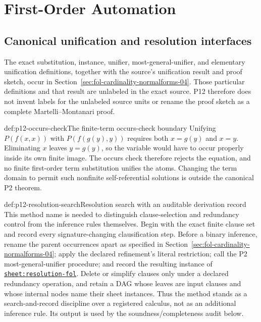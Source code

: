 \chapter{First-Order Automation}
\label{sec:p12-first-order-automation}

\section{Canonical unification and resolution interfaces}

The exact substitution, instance, unifier, most-general-unifier, and elementary
unification definitions, together with the source's unification result and
proof sketch, occur in Section~\ref{sec:fol-cardinality-normalforms-04}.
Those particular definitions and that result are unlabeled in the exact
source.  P12 therefore does not invent labels for the unlabeled source units
or rename the proof sketch as a complete Martelli--Montanari proof.

\begin{hbexample}{def:p12-occurs-check}{The finite-term occurs-check boundary}
Unifying \(P(f(x,x))\) with \(P(f(g(y),y))\) requires both \(x=g(y)\) and
\(x=y\).  Eliminating \(x\) leaves \(y=g(y)\), so the variable would have to
occur properly inside its own finite image.  The occurs check therefore
rejects the equation, and no finite first-order term substitution unifies the
atoms.  Changing the term domain to permit such nonfinite self-referential
solutions is outside the canonical P2 theorem.
\end{hbexample}

\begin{hbmethod}{def:p12-resolution-search}{Resolution search with an auditable derivation record}
This method name is needed to distinguish clause-selection and redundancy
control from the inference rules themselves.  Begin with the exact finite
clause set and record every signature-changing clausification step.  Before a
binary inference, rename the parent occurrences apart as specified in
Section~\ref{sec:fol-cardinality-normalforms-04}; apply the declared refinement's
literal restriction; call the P2 most-general-unifier
procedure; and record the resulting instance of
\hyperref[sheet:resolution-fol]{\texttt{sheet:resolution-fol}}.  Delete or
simplify clauses only under a declared redundancy operation, and retain a DAG
whose leaves are input clauses and whose internal nodes name their sheet
instances.  Thus the method stands as a search-and-record discipline over a
registered calculus, not as an additional inference rule.  Its output is used
by the soundness/completeness audit below.
\end{hbmethod}

